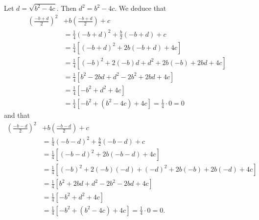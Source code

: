 Let $d = \sqrt{b^2 - 4 c}$. Then $d^2 = b^2 - 4 c$. We deduce that
\begin{align*}
	\left( \frac{-b + d}{2} \right)^2 & + b \left( \frac{-b + d}{2} \right) + c                                         \\
	                                  & = \frac{1}{4}(-b + d)^2 + \frac{b}{2}(-b + d) + c                               \\
	                                  & = \frac{1}{4} \left[ (-b + d)^2 + 2 b (-b + d) + 4 c \right]                    \\
	                                  & = \frac{1}{4} \left[ (-b)^2 + 2 (-b) d + d^2 + 2 b (-b) + 2 b d + 4 c \right]   \\
	                                  & = \frac{1}{4} \left[ b^2 - 2 b d + d^2 - 2 b^2 + 2 b d + 4 c \right]            \\
	                                  & = \frac{1}{4} \left[ -b^2 + d^2 + 4 c \right]                                   \\
	                                  & = \frac{1}{4} \left[ -b^2 + (b^2 - 4 c) + 4 c \right] = \frac{1}{4} \cdot 0 = 0
\end{align*}
and that
\begin{align*}
	\left( \frac{-b - d}{2} \right)^2 & + b \left( \frac{-b - d}{2} \right) + c                                                \\
	                                  & = \frac{1}{4}(-b - d)^2 + \frac{b}{2}(-b - d) + c                                      \\
	                                  & = \frac{1}{4} \left[ (-b - d)^2 + 2 b (-b - d) + 4 c \right]                           \\
	                                  & = \frac{1}{4} \left[ (-b)^2 + 2 (-b) (-d) + (-d)^2 + 2 b (-b) + 2 b (-d) + 4 c \right] \\
	                                  & = \frac{1}{4} \left[ b^2 + 2 b d + d^2 - 2 b^2 - 2 b d + 4 c \right]                   \\
	                                  & = \frac{1}{4} \left[ -b^2 + d^2 + 4 c \right]                                          \\
	                                  & = \frac{1}{4} \left[ -b^2 + (b^2 - 4 c) + 4 c \right] = \frac{1}{4} \cdot 0 = 0.
\end{align*}

